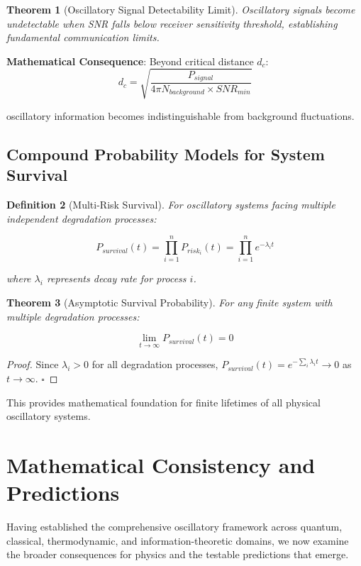 \documentclass[11pt]{article}
\newtheorem{theorem}{Theorem}[section]
\newtheorem{definition}[theorem]{Definition}
\theoremstyle{remark}
\begin{document}
\begin{theorem}[Oscillatory Signal Detectability Limit]
Oscillatory signals become undetectable when SNR falls below receiver sensitivity threshold, establishing fundamental communication limits.
\end{theorem}

\textbf{Mathematical Consequence}: Beyond critical distance $d_c$:
$$d_c = \sqrt{\frac{P_{signal}}{4\pi N_{background} \times SNR_{min}}}$$

oscillatory information becomes indistinguishable from background fluctuations.

\subsection{Compound Probability Models for System Survival}

\begin{definition}[Multi-Risk Survival]
For oscillatory systems facing multiple independent degradation processes:

$$P_{survival}(t) = \prod_{i=1}^{n} P_{risk_i}(t) = \prod_{i=1}^{n} e^{-\lambda_i t}$$

where $\lambda_i$ represents decay rate for process $i$.
\end{definition}

\begin{theorem}[Asymptotic Survival Probability]
For any finite system with multiple degradation processes:

$$\lim_{t \to \infty} P_{survival}(t) = 0$$
\end{theorem}

\begin{proof}
Since $\lambda_i > 0$ for all degradation processes, $P_{survival}(t) = e^{-\sum_i \lambda_i t} \to 0$ as $t \to \infty$. $\square$
\end{proof}

This provides mathematical foundation for finite lifetimes of all physical oscillatory systems.

\section{Mathematical Consistency and Predictions}

Having established the comprehensive oscillatory framework across quantum, classical, thermodynamic, and information-theoretic domains, we now examine the broader consequences for physics and the testable predictions that emerge.
\end{document}
